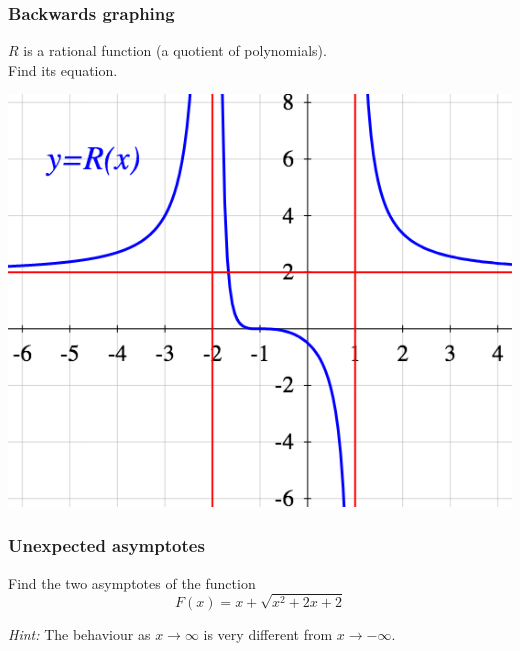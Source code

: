 \documentclass[14pt]{beamer}
\begin{document}
	\begin{frame}[t]
		\frametitle{Backwards graphing }

		$R$ is a rational function (a quotient of polynomials). \\ Find its equation.
		\begin{center}
			\includegraphics[scale=.4]{G19}
		\end{center}
	\end{frame}


	\begin{frame}[t]
		\frametitle{Unexpected asymptotes}

		Find the two asymptotes of the function
		\[
			F(x) = x + \sqrt{x^{2}+2x+ 2}
		\]

		\emph{Hint:} The behaviour as $x \to \infty$ is very different from
		$x \to - \infty$.

		\ \hfill \href{https://www.desmos.com/calculator/kffnbl6pnc}{}
	\end{frame}

\end{document}
